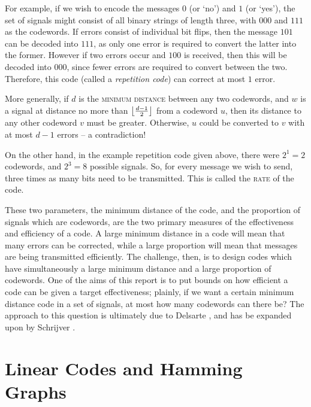 \documentclass{report}
\begin{document}
    For example, if we wish to encode the messages $0$ (or `no') and $1$ (or
    `yes'), the set of signals might consist of all binary strings of length
    three, with $000$ and $111$ as the codewords.  If errors consist of
    individual bit flips, then the message $101$ can be decoded into $111$, as
    only one error is required to convert the latter into the former.  However
    if two errors occur and $100$ is received, then this will be decoded into
    $000$, since fewer errors are required to convert between the two.
    Therefore, this code (called a \textit{repetition code}) can correct at most
    $1$ error.

    More generally, if $d$ is the \textsc{minimum distance} between any two
    codewords, and $w$ is a signal at distance no more than $\left\lfloor \frac{d -
    1}{2} \right\rfloor$ from a codeword $u$, then its distance to any other codeword $v$
    must be greater.  Otherwise, $u$ could be converted to $v$ with at most $d -
    1$ errors -- a contradiction!

    On the other hand, in the example repetition code given above, there were
    $2^1 = 2$ codewords, and $2^3 = 8$ possible signals.  So, for every message
    we wish to send, three times as many bits need to be transmitted.  This is
    called the \textsc{rate} of the code.

    These two parameters, the minimum distance of the code, and the proportion
    of signals which are codewords, are the two primary measures of the
    effectiveness and efficiency of a code.  A large minimum distance in a code
    will mean that many errors can be corrected, while a large proportion will
    mean that messages are being transmitted efficiently.  The challenge, then,
    is to design codes which have simultaneously a large minimum distance and a
    large proportion of codewords.  One of the aims of this report is to put
    bounds on how efficient a code can be given a target effectiveness; plainly,
    if we want a certain minimum distance code in a set of signals, at most how
    many codewords can there be?  The approach to this question is ultimately
    due to Delsarte \cite{delsarte}, and has be expanded upon by Schrijver
    \cite{schrijver}.

  \section{Linear Codes and Hamming Graphs}
\end{document}
